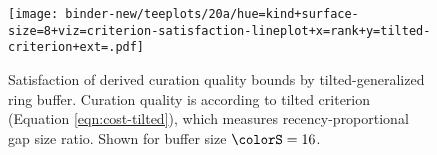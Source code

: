 \begin{figure}
\vspace{0pt}
  \centering
  \texttt{[image: binder-new/teeplots/20a/hue=kind+surface-size=8+viz=criterion-satisfaction-lineplot+x=rank+y=tilted-criterion+ext=.pdf]}

\vspace{-3ex}
\caption{%
  Satisfaction of derived curation quality bounds by tilted-generalized ring buffer.
  \footnotesize
  Curation quality is according to tilted criterion (Equation \ref{eqn:cost-tilted}), which measures recency-proportional gap size ratio.
  Shown for buffer size $\colorS=16$.
}
\label{fig:hsurf-tilted-implementation-satisfaction}
\end{figure}
